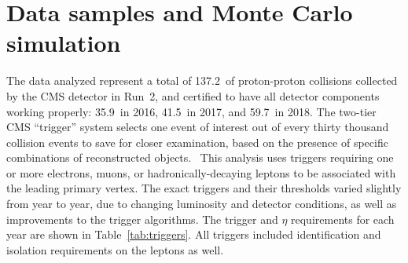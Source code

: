 \section{Data samples and Monte Carlo simulation}
\label{sec:datasets}

The data analyzed represent a total of 137.2~\fbinv of proton-proton collisions
collected by the CMS detector in Run~2, and certified to have all detector components
working properly: 35.9~\fbinv in 2016, 41.5~\fbinv in 2017, and 59.7~\fbinv in 2018.
The two-tier CMS ``trigger'' system selects one event of interest out of every thirty
thousand collision events to save for closer examination, based on the presence of
specific combinations of reconstructed objects.~\cite{CMS_trigger}  This analysis
uses triggers requiring one or more electrons, muons, or hadronically-decaying \Pgt
leptons to be associated with the leading primary vertex. The exact triggers and their
thresholds varied slightly from year to year, due to changing luminosity and detector
conditions, as well as improvements to the trigger algorithms.  The trigger \pt and
$\eta$ requirements for each year are shown in Table~\ref{tab:triggers}.  All
triggers included identification and isolation requirements on the leptons as well.

